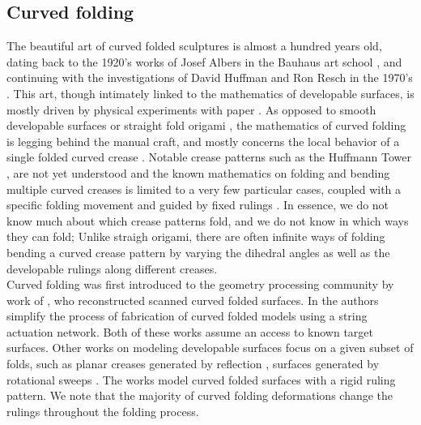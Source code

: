 \subsection{Curved folding}
The beautiful art of curved folded sculptures is almost a hundred years old, dating back to the 1920's works of Josef Albers in the Bauhaus art school \cite{josef_albers_thesis}, and continuing with the investigations of David Huffman and Ron Resch in the 1970's \cite{huffman,resch1974portfolio}. This art, though intimately linked to the mathematics of developable surfaces, is mostly driven by physical experiments with paper \cite{curved_review}. As opposed to smooth developable surfaces \cite{do_carmo} or straight fold origami \cite{origami_book}, the mathematics of curved folding is legging behind the manual craft, and mostly concerns the local behavior of a single folded curved crease \cite{duncan_folded,mathematical_omnibus,curved_review}. Notable crease patterns such as the Huffmann Tower \cite{huffman2,huffmann_reconstructing}, are not yet understood \cite{demaine2018conic} and the known mathematics on folding and bending multiple curved creases is limited to a very few particular cases, coupled with a specific folding movement and guided by fixed rulings \cite{demaine_lens, demaine2018conic}. In essence, we do not know much about which crease patterns fold, and we do not know in which ways they can fold; Unlike straigh origami, there are often infinite ways of folding bending a curved crease pattern by varying the dihedral angles as well as the developable rulings along different creases. \\
Curved folding was first introduced to the geometry processing community by work of \cite{curved_folding_kilian}, who reconstructed scanned curved folded surfaces. In \cite{StringActuated:2017} the authors simplify the process of fabrication of curved folded models using a string actuation network. Both of these works assume an access to known target surfaces. Other works on modeling developable surfaces focus on a given subset of folds, such as planar creases generated by reflection \cite{mitani2012column,Mitani_ref}, surfaces generated by rotational sweeps \cite{mitani2009design}. The works \cite{pottmann_new} model curved folded surfaces with a rigid ruling pattern. We note that the majority of curved folding deformations change the rulings throughout the folding process. 
